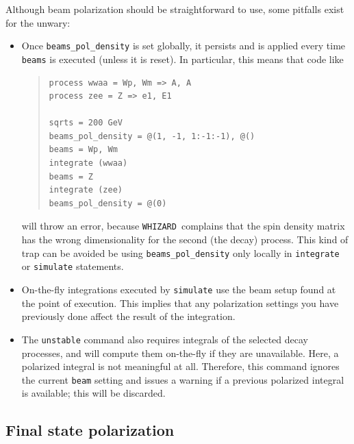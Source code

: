 \documentclass[12pt]{book}
\newcommand{\ttt}[1]{\texttt{#1}}
\newcommand{\whizard}{\ttt{WHIZARD}}
\begin{document}
Although beam polarization should be straightforward to use, some pitfalls exist
for the unwary:
\begin{itemize}
\item Once \ttt{beams\_pol\_density} is set globally, it persists and
is applied every time \ttt{beams} is executed (unless it is reset). In
particular, this means that code like
\begin{quote}
\begin{footnotesize}
\begin{verbatim}
process wwaa = Wp, Wm => A, A
process zee = Z => e1, E1

sqrts = 200 GeV
beams_pol_density = @(1, -1, 1:-1:-1), @()
beams = Wp, Wm
integrate (wwaa)
beams = Z
integrate (zee)
beams_pol_density = @(0)
\end{verbatim}
\end{footnotesize}
\end{quote}
will throw an error, because \whizard\ complains that the spin density
matrix has the wrong dimensionality for the second (the decay) process.
This kind of trap can be avoided be using \ttt{beams\_pol\_density}
only locally in \ttt{integrate} or \ttt{simulate} statements.
%
\item On-the-fly integrations executed by \ttt{simulate}
use the beam
setup found at the point of execution. This implies that any polarization
settings you have previously done affect the result of the integration.
%
\item The \ttt{unstable} command also requires integrals of the selected decay
  processes, and will compute them on-the-fly if they are unavailable.  Here,
  a polarized integral is not meaningful at all.  Therefore, this command
  ignores the current \ttt{beam} setting and issues a warning if a previous
  polarized integral is available; this will be discarded.
\end{itemize}


\subsection{Final state polarization}
\end{document}
